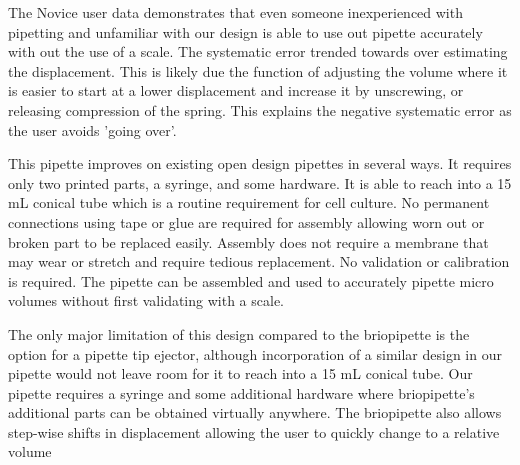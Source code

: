 \documentclass[10pt,letterpaper]{article}
\begin{document}
The Novice user data demonstrates that even someone inexperienced with pipetting and unfamiliar with our design is able to use out pipette accurately with out the use of a scale. 
The systematic error trended towards over estimating the displacement. 
This is likely due the function of adjusting the volume where it is easier to start at a lower displacement and increase it by unscrewing, or releasing compression of the spring.
This explains the negative systematic error as the user avoids 'going over'.

This pipette improves on existing open design pipettes in several ways. 
It requires only two printed parts, a syringe, and some hardware.
It is able to reach into a 15 mL conical tube which is a routine requirement for cell culture.
No permanent connections using tape or glue are required for assembly allowing worn out or broken part to be replaced easily.
Assembly does not require a membrane that may wear or stretch and require tedious replacement.
No validation or calibration is required.
The pipette can be assembled and used to accurately pipette micro volumes without first validating with a scale.

The only major limitation of this design compared to the briopipette is the option for a pipette tip ejector, although incorporation of a similar design in our pipette would not leave room for it to reach into a 15 mL conical tube. 
Our pipette requires a syringe and some additional hardware where briopipette's additional parts can be obtained virtually anywhere.
The briopipette also allows step-wise shifts in displacement allowing the user to quickly change to a relative volume
\end{document}
